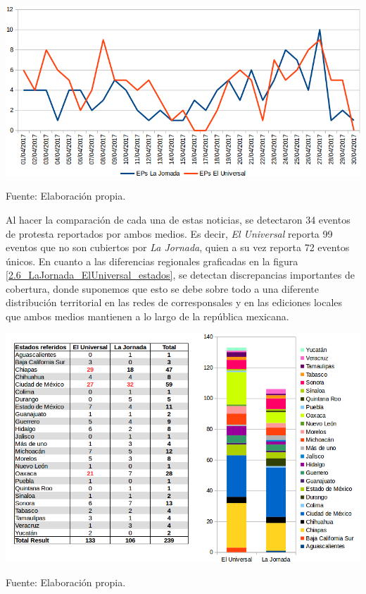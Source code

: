 \documentclass[letterpaper, 11pt]{book}
\theoremstyle{definition}
\theoremstyle{remark}
\begin{document}
\hspace{-1em}\begin{minipage}{\linewidth}
\centering
{} \label{2.5_LaJornada_vs_ElUniversal}
\includegraphics[scale=0.45]{img/2.5_LaJornada_vs_ElUniversal.png}
\par\bigskip
\small Fuente: Elaboración propia.
\end{minipage}\bigskip


Al hacer la comparación de cada una de estas noticias, se detectaron 34 eventos de protesta reportados por ambos medios. 
Es decir, \emph{El Universal} reporta 99 eventos que no son cubiertos por \emph{La Jornada}, quien a su vez reporta 72 eventos únicos. 
En cuanto a las diferencias regionales graficadas en la figura \ref{2.6_LaJornada_ElUniversal_estados}, se detectan discrepancias importantes de cobertura, donde suponemos que esto se debe sobre todo a una diferente distribución territorial en las redes de corresponsales y en las ediciones locales que ambos medios mantienen a lo largo de la república mexicana.


\begin{minipage}{\linewidth}
\centering
{} \label{2.6_LaJornada_ElUniversal_estados}
\includegraphics[scale=0.37]{img/2.6_LaJornada_ElUniversal_estados.png}
\par\bigskip
\small Fuente: Elaboración propia.
\end{minipage}\bigskip
\end{document}
